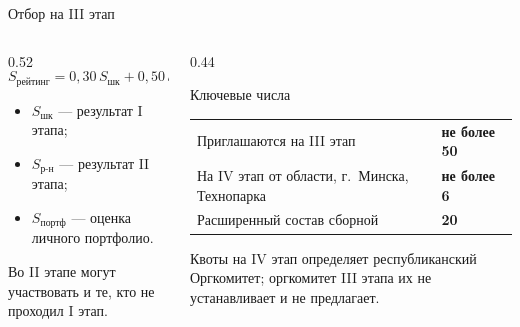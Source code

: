 \begin{frame}{Отбор на III этап}
  \begin{columns}[T]
    \begin{column}{0.52\textwidth}
      \vspace{0.5em}
      \[
        S_{\text{рейтинг}} = 0{,}30\,S_{\text{шк}} + 0{,}50\,S_{\text{р-н}} + 0{,}20\,S_{\text{портф}}
      \]
      \vspace{-0.5em}
      \begin{itemize}\setlength\itemsep{0.3em}
        \item $S_{\text{шк}}$ --- результат I этапа;
        \item $S_{\text{р-н}}$ --- результат II этапа;
        \item $S_{\text{портф}}$ --- оценка личного портфолио.
      \end{itemize}
      \medskip
      Во II этапе могут участвовать и те, кто не проходил I этап.
    \end{column}
    \begin{column}{0.44\textwidth}
      \begin{block}{Ключевые числа}
        \begin{tabular}{@{}p{}>{\raggedleft\arraybackslash}p{}@{}}
          Приглашаются на III этап & \textbf{не более 50} \\[0.35em]
          На IV этап от области, г.~Минска, Технопарка & \textbf{не более 6} \\[0.35em]
          Расширенный состав сборной & \textbf{20} \\
        \end{tabular}
      \end{block}
      {\footnotesize\color{acGray}
      Квоты на IV этап определяет республиканский Оргкомитет;
      оргкомитет III этапа их не устанавливает и не предлагает.}
    \end{column}
  \end{columns}
\end{frame}
